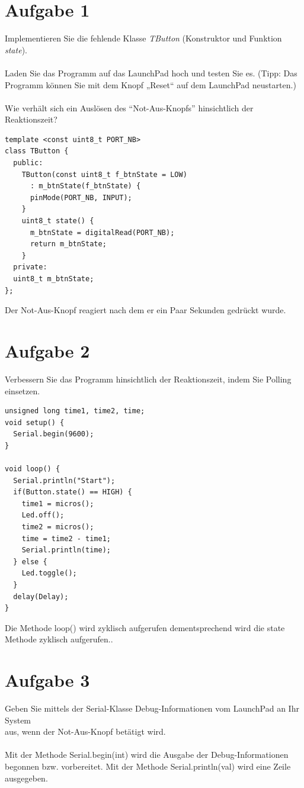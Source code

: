 \section{Aufgabe 1}
Implementieren Sie die fehlende Klasse \textit{TButton} (Konstruktor und Funktion \textit{state}).\\ \\
Laden Sie das Programm auf das LaunchPad hoch und testen Sie es. (Tipp: Das\\
Programm können Sie mit dem Knopf „Reset“ auf dem LaunchPad neustarten.)\\ \\
Wie verhält sich ein Auslösen des $“$Not-Aus-Knopfs$”$ hinsichtlich der Reaktionszeit?\\
\begin{lstlisting}[label =lst:bash]
template <const uint8_t PORT_NB>
class TButton {
  public:
    TButton(const uint8_t f_btnState = LOW)
      : m_btnState(f_btnState) {
      pinMode(PORT_NB, INPUT);
    }
    uint8_t state() {
      m_btnState = digitalRead(PORT_NB);
      return m_btnState;
    }
  private:
  uint8_t m_btnState;
};
\end{lstlisting}
Der Not-Aus-Knopf reagiert nach dem er ein Paar Sekunden gedrückt wurde.
\newpage
\section{Aufgabe 2}
Verbessern Sie das Programm hinsichtlich der Reaktionszeit, indem Sie Polling einsetzen.\\
\begin{lstlisting}[label =lst:bash]
unsigned long time1, time2, time;
void setup() {
  Serial.begin(9600);
}

void loop() {
  Serial.println("Start");  
  if(Button.state() == HIGH) {
    time1 = micros();
    Led.off();
    time2 = micros();
    time = time2 - time1;
    Serial.println(time);
  } else {
    Led.toggle(); 
  }
  delay(Delay);   
}
\end{lstlisting}
Die Methode loop() wird zyklisch aufgerufen dementsprechend wird die state Methode zyklisch aufgerufen..\\
\section{Aufgabe 3}
Geben Sie mittels der Serial-Klasse Debug-Informationen vom LaunchPad an Ihr System\\
aus, wenn der Not-Aus-Knopf betätigt wird.\\ \\
Mit der Methode Serial.begin(int) wird die Ausgabe der Debug-Informationen begonnen bzw. vorbereitet. Mit der Methode Serial.println(val) wird eine Zeile ausgegeben.\\ \\
\newpage
